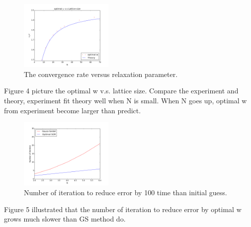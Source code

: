 \documentclass[12pt]{article}
\begin{document}
\begin{figure}[h!]
	\begin{center}
		\includegraphics[width=0.4\textwidth]{optimal.png}
		\caption{The convergence rate versus relaxation parameter.}
		\label{fig4}
	\end{center}
\end{figure}
Figure 4 picture the optimal w v.s. lattice size. Compare the experiment and theory, experiment fit theory well when N is small. When N goes up, optimal w from experiment become larger than predict.

\begin{figure}[h!]
	\begin{center}
		\includegraphics[width=0.4\textwidth]{iteraion.png}
		\caption{Number of iteration to reduce error by 100 time than initial guess.}
	\end{center}
\end{figure}
Figure 5 illustrated that the number of iteration to reduce error by optimal w grows much slower than GS method do. 
\end{document}
